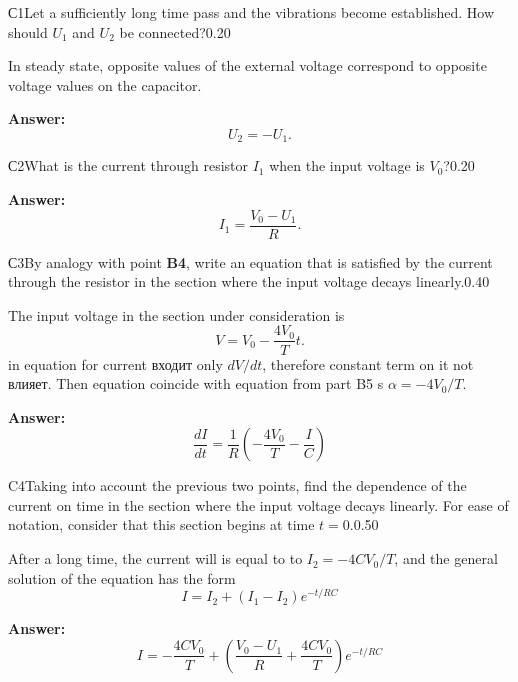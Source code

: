 \documentclass[11pt,a4paper]{article}
\begin{document}
\begin{solcard}{С1}{Let a sufficiently long time pass and the vibrations become established. How should $U_1$ and $U_2$ be connected?}{0.20}

In steady state, opposite values of the external voltage correspond to opposite voltage values on the capacitor.

\par\smallskip\noindent\textbf{Answer:} $$ U_2= - U_1. $$
\end{solcard}

\begin{solcard}{С2}{What is the current through resistor $I_1$ when the input voltage is $V_0$?}{0.20}
\par\smallskip\noindent\textbf{Answer:} $$ I_1 = \frac{V_0 - U_1}{R}. $$
\end{solcard}

\begin{solcard}{С3}{By analogy with point \textbf{B4}, write an equation that is satisfied by the current through the resistor in the section where the input voltage decays linearly.}{0.40}

The input voltage in the section under consideration is $$ V = V_0 - \frac{4 V_0}{T} t. $$ in equation for current входит only $dV/dt$, therefore constant term on it not влияет. Then equation coincide with equation from part B5 s $\alpha = - 4V_0/T$.

\par\smallskip\noindent\textbf{Answer:} $$ \frac{dI}{dt} = \frac{1}{R} \left(- \frac{4 V_0}{T} - \frac{I}{C} \right) $$
\end{solcard}

\begin{solcard}{C4}{Taking into account the previous two points, find the dependence of the current on time in the section where the input voltage decays linearly. For ease of notation, consider that this section begins at time $t = 0$.}{0.50}

After a long time, the current will is equal to to $I_2 = - 4 C V_0/T$, and the general solution of the equation has the form $$ I = I_2 + (I_1 - I_2 )e ^{-t/RC} $$

\par\smallskip\noindent\textbf{Answer:} $$ I = - \frac{4 CV_0 }{T} + \left( \frac{V_0- U_1}{R} + \frac{4 CV_0 }{T} \right) e^{- t/RC} $$
\end{solcard}
\end{document}

